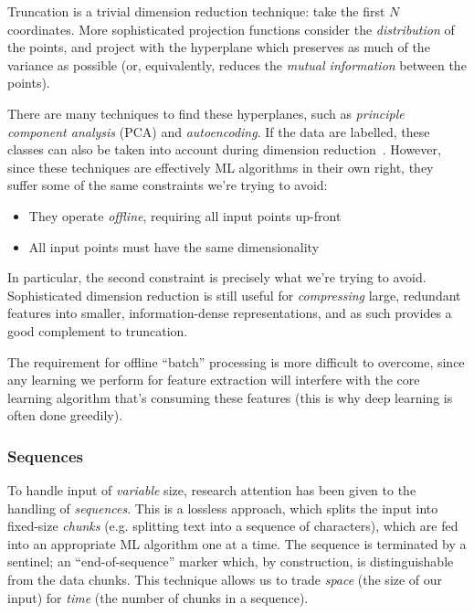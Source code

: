 Truncation is a trivial dimension reduction technique: take the first $N$
coordinates. More sophisticated projection functions consider the
\emph{distribution} of the points, and project with the hyperplane which
preserves as much of the variance as possible (or, equivalently, reduces the
\emph{mutual information} between the points).

There are many techniques to find these hyperplanes, such as \emph{principle
  component analysis} (PCA) and \emph{autoencoding}. If the data are labelled,
these classes can also be taken into account during dimension
reduction~\cite{Oveisi.Oveisi.Erfanian.ea:2012}. However, since these
techniques are effectively ML algorithms in their own right, they suffer some of
the same constraints we're trying to avoid:

\begin{itemize}
  \item They operate \emph{offline}, requiring all input points up-front
  \item All input points must have the same dimensionality
\end{itemize}

In particular, the second constraint is precisely what we're trying to
avoid. Sophisticated dimension reduction is still useful for \emph{compressing}
large, redundant features into smaller, information-dense representations, and
as such provides a good complement to truncation.

The requirement for offline ``batch'' processing is more difficult to overcome,
since any learning we perform for feature extraction will interfere with the
core learning algorithm that's consuming these features (this is why deep
learning is often done greedily).

\subsubsection{Sequences}

To handle input of \emph{variable} size, research attention has been given to
the handling of \emph{sequences}. This is a lossless approach, which splits the
input into fixed-size \emph{chunks} (e.g. splitting text into a sequence of
characters), which are fed into an appropriate ML algorithm one at a time. The
sequence is terminated by a sentinel; an ``end-of-sequence'' marker which, by
construction, is distinguishable from the data chunks. This technique allows us
to trade \emph{space} (the size of our input) for \emph{time} (the number of
chunks in a sequence).

